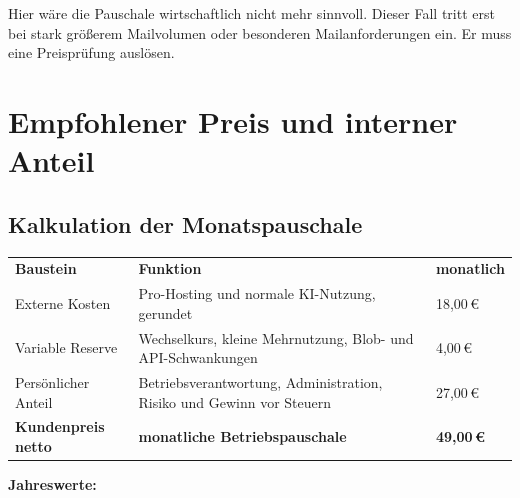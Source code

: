 \documentclass[11pt,a4paper]{article}
\newcommand{\eur}[1]{#1\,€}
\begin{document}
Hier wäre die Pauschale wirtschaftlich nicht mehr sinnvoll. Dieser Fall tritt erst bei stark größerem Mailvolumen oder besonderen Mailanforderungen ein. Er muss eine Preisprüfung auslösen.

\section{Empfohlener Preis und interner Anteil}

\subsection{Kalkulation der Monatspauschale}

\begin{center}
\end{center}

\begin{tabularx}{\textwidth}{L{52mm}Y R{31mm}}
  \toprule
  \color{white}\sffamily\bfseries Baustein &
  \color{white}\sffamily\bfseries Funktion &
  \color{white}\sffamily\bfseries monatlich \\
  Externe Kosten & Pro-Hosting und normale KI-Nutzung, gerundet & \eur{18,00} \\
  Variable Reserve & Wechselkurs, kleine Mehrnutzung, Blob- und API-Schwankungen & \eur{4,00} \\
  Persönlicher Anteil & Betriebsverantwortung, Administration, Risiko und Gewinn vor Steuern & \eur{27,00} \\
  \midrule
  \sffamily\bfseries Kundenpreis netto & \sffamily\bfseries monatliche Betriebspauschale & \sffamily\bfseries\eur{49,00} \\
  \bottomrule
\end{tabularx}

\textbf{Jahreswerte:}
\end{document}
